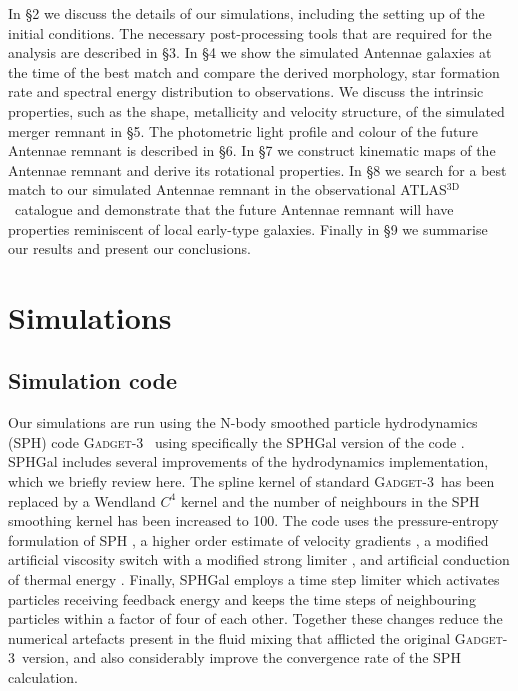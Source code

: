 \documentclass[a4paper,fleqn,usenatbib]{mnras}
\newcommand{\atlas}{\textsc{ATLAS$^\mathrm{3D}$}}
\newcommand{\gadget}{\textsc{Gadget-3}}
\begin{document}
In \S 2 we discuss the details of our simulations, including the setting up of the initial conditions. The necessary post-processing tools that are required for the
analysis are described in \S 3. In \S 4 we show the simulated Antennae galaxies at the time of the best match and compare the derived morphology, star formation
rate and spectral energy distribution to observations. We discuss the intrinsic properties, such as the shape, metallicity and velocity structure, 
of the simulated merger remnant in \S 5. The photometric light profile and colour of the future Antennae remnant is described in \S 6. In \S 7 we construct 
kinematic maps of the Antennae remnant and derive its rotational properties. In \S 8 we search for a best match to our simulated Antennae remnant 
in the observational \atlas\ catalogue 
and demonstrate that the future Antennae remnant will have properties reminiscent of local early-type galaxies. Finally in \S 9 we summarise our 
results and present our conclusions. 

\section{Simulations}

\subsection{Simulation code}

Our simulations are run using the N-body smoothed particle hydrodynamics (SPH) code 
\gadget\ \citep{2005MNRAS.364.1105S} using specifically the SPHGal version of the code 
\citep{2014MNRAS.443.1173H,2017MNRAS.468..751E}. SPHGal includes several improvements of the hydrodynamics 
implementation, which we briefly review here. The spline kernel of standard \gadget\
has been replaced by a Wendland $C^4$ kernel \citep{2012MNRAS.425.1068D} and the number of 
neighbours in the SPH smoothing kernel has been increased to 100. The code uses the pressure-entropy formulation 
of SPH \citep{2013ApJ...768...44S,2013MNRAS.428.2840H}, a higher order estimate of velocity gradients \citep{2010MNRAS.408..669C}, 
a modified artificial viscosity switch with a modified strong limiter \citep{1997JCoPh.136...41M,2010MNRAS.408..669C}, and artificial 
conduction of thermal energy \citep{2008JCoPh.22710040P}. Finally, SPHGal employs a time step limiter which activates particles 
receiving feedback energy and keeps the time steps of neighbouring particles within a factor of four of each other. 
Together these changes reduce the numerical artefacts present in the fluid mixing that afflicted the  
original \gadget\ version, and also considerably improve the convergence rate of the SPH calculation. 
\end{document}
